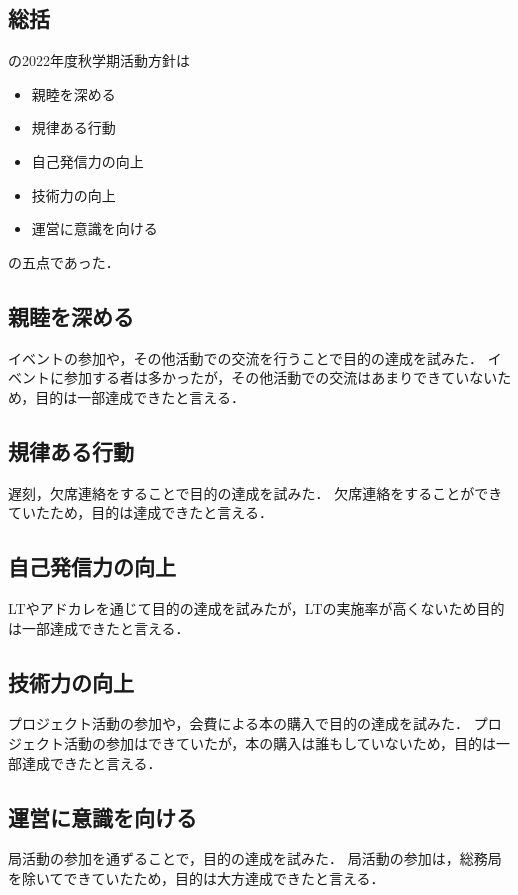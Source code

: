 \subsection*{\firstGrade{}総括}


\firstGrade{}の2022年度秋学期活動方針は
\begin{itemize}
    \item 親睦を深める
    \item 規律ある行動
    \item 自己発信力の向上
    \item 技術力の向上
    \item 運営に意識を向ける
\end{itemize}
の五点であった．

\subsection*{親睦を深める}
イベントの参加や，その他活動での交流を行うことで目的の達成を試みた．
イベントに参加する者は多かったが，その他活動での交流はあまりできていないため，目的は一部達成できたと言える．

\subsection*{規律ある行動}
遅刻，欠席連絡をすることで目的の達成を試みた．
欠席連絡をすることができていたため，目的は達成できたと言える．

\subsection*{自己発信力の向上}
LTやアドカレを通じて目的の達成を試みたが，LTの実施率が高くないため目的は一部達成できたと言える．

\subsection*{技術力の向上}
プロジェクト活動の参加や，会費による本の購入で目的の達成を試みた．
プロジェクト活動の参加はできていたが，本の購入は誰もしていないため，目的は一部達成できたと言える．

\subsection*{運営に意識を向ける}
局活動の参加を通ずることで，目的の達成を試みた．
局活動の参加は，総務局を除いてできていたため，目的は大方達成できたと言える．

